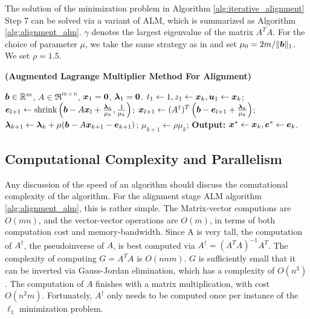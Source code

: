 \documentclass[10pt,twocolumn,letterpaper]{article}
\begin{document}
The solution of the minimization problem in Algorithm
\eqref{alg:iterative_alignment} Step 7 can be solved via a
variant of ALM, which is summarized as Algorithm \eqref{alg:alignment_alm}.
$\gamma$ denotes the largest eigenvalue of the matrix $A^TA$. For the choice of
parameter $\mu$, we take the same strategy as in \cite{YangJ2009-pp} and set
$\mu_0 = 2m / \|{\boldsymbol{b}}\|_1$. We set $\rho=1.5$.

\begin{algorithm}[h]
\caption{\bf (Augmented Lagrange Multiplier Method For Alignment)}
\begin{algorithmic}[1]
 ${\boldsymbol{b}} \in {\mathbb{R}}^m$, $A \in \Re^{m \times n}$,
${\boldsymbol{x}}_1 = \boldsymbol{0}$, $\boldsymbol{\lambda}_1 = \boldsymbol{0}$.
\STATE $t_{1} \leftarrow 1, z_{1} \leftarrow {\boldsymbol{x}}_{k}, \boldsymbol{u}_{1} \leftarrow {\boldsymbol{x}}_{k}$;
\STATE $\boldsymbol{e}_{l+1} \leftarrow \textup{shrink}\left({\boldsymbol{b}} - A{\boldsymbol{x}}_l + \frac{\boldsymbol{\lambda}_k}{\mu_k}, \frac{1}{\mu_k}\right)$;
\STATE ${\boldsymbol{x}}_{l+1} \leftarrow (A^\dagger)^T \left({\boldsymbol{b}} - \boldsymbol{e}_{l+1} + \frac{\boldsymbol{\lambda}_k}{\mu_k} \right) $;
\ENDWHILE
\STATE $\boldsymbol{\lambda}_{k+1} \leftarrow \boldsymbol{\lambda}_k + \mu ({\boldsymbol{b}} - A{\boldsymbol{x}}_{k+1} - \boldsymbol{e}_{k+1})$;
\STATE $\mu_{k+1} \leftarrow \rho\mu_k$;
\ENDWHILE \STATE
{\bf Output:} ${\boldsymbol{x}}^* \leftarrow {\boldsymbol{x}}_k, \boldsymbol{e}^* \leftarrow \boldsymbol{e}_k$.
\end{algorithmic}
\label{alg:alignment_alm}
\end{algorithm}

\subsection{Computational Complexity and Parallelism} Any discussion of the speed of an
algorithm should discuss the comutational complexity of the algorithm.  For the
alignment stage ALM algorithm \eqref{alg:alignment_alm}, this is rather simple.
The Matrix-vector computions are $O(mn)$, and the vector-vector operations are
$O(m)$, in terms of both computation cost and memory-bandwidth.  Since A is
very tall, the computation of $A^\dagger$, the pseudoinverse of $A$, is best
computed via $A^\dagger = (A^TA)^{-1} A^T$.  The complexity of computing $G =
A^T A$ is $O(nnm)$.  $G$ is sufficiently small that it can be inverted via
Gauss-Jordan elimination, which has a complexity of $O(n^3)$.  The computation
of $A$ finishes with a matrix multiplication, with cost $O(n^2 m)$.
Fortunately, $A^\dagger$ only needs to be computed once per instance of the
$\ell_1$ minimization problem.
\end{document}
